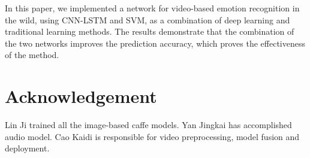\documentclass[10pt,twocolumn,letterpaper]{article}
\begin{document}
In this paper, we implemented a network for video-based emotion recognition in the wild, using CNN-LSTM and SVM, as a combination of deep learning and traditional learning methods. The results demonstrate that the combination of the two networks improves the prediction accuracy, which proves the effectiveness of the method.

\section{Acknowledgement}

Lin Ji trained all the image-based caffe models. Yan Jingkai has accomplished audio model. Cao Kaidi is responsible for video preprocessing, model fusion and deployment.

{\small


}
\end{document}
